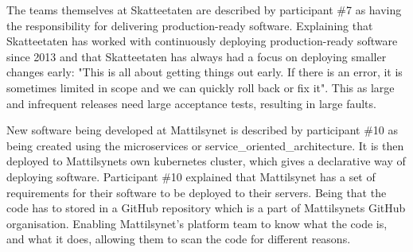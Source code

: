 
The teams themselves at Skatteetaten are described by participant \#7 as having the responsibility for delivering production-ready software. Explaining that Skatteetaten has worked with continuously deploying production-ready software since 2013 and that Skatteetaten has always had a focus on deploying smaller changes early: "This is all about getting things out early. If there is an error, it is sometimes limited in scope and we can quickly roll back or fix it". This as large and infrequent releases need large acceptance tests, resulting in large faults.


New software being developed at Mattilsynet is described by participant \#10 as being created using the \gls{microservices} or \gls{service_oriented_architecture}. It is then deployed to Mattilsynets own \gls{kubernetes} cluster, which gives a declarative way of deploying software. Participant \#10 explained that Mattilsynet has a set of requirements for their software to be deployed to their servers. Being that the code has to stored in a GitHub repository which is a part of Mattilsynets GitHub organisation. Enabling Mattilsynet's platform team to know what the code is, and what it does, allowing them to scan the code for different reasons.

